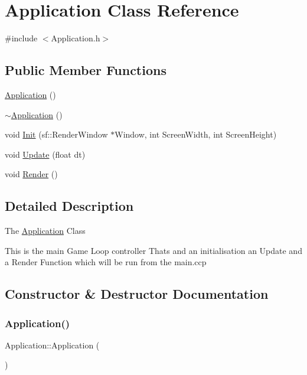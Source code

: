 \hypertarget{class_application}{}\section{Application Class Reference}
\label{class_application}


{\ttfamily \#include $<$Application.\+h$>$}

\subsection*{Public Member Functions}
\begin{DoxyCompactItemize}
\item 
\hyperlink{class_application_afa8cc05ce6b6092be5ecdfdae44e05f8}{Application} ()
\item 
\hyperlink{class_application_a748bca84fefb9c12661cfaa2f623748d}{$\sim$\+Application} ()
\item 
void \hyperlink{class_application_a2e40123b025f8cab8fee0120792f670a}{Init} (sf\+::\+Render\+Window $\ast$Window, int Screen\+Width, int Screen\+Height)
\item 
void \hyperlink{class_application_a28c5c9dba1b7a8ca51b54b6e624c22b6}{Update} (float dt)
\item 
void \hyperlink{class_application_a6f40ffdb97f3a938ae19ea4eae4882ed}{Render} ()
\end{DoxyCompactItemize}


\subsection{Detailed Description}
The \hyperlink{class_application}{Application} Class

This is the main Game Loop controller Thats and an initialisation an Update and a Render Function which will be run from the main.\+ccp 

\subsection{Constructor \& Destructor Documentation}
\hypertarget{class_application_afa8cc05ce6b6092be5ecdfdae44e05f8}{}\label{class_application_afa8cc05ce6b6092be5ecdfdae44e05f8} 
\subsubsection{\texorpdfstring{Application()}{Application()}}
{\footnotesize\ttfamily Application\+::\+Application (\begin{DoxyParamCaption}{ }\end{DoxyParamCaption})}

